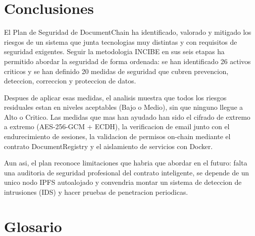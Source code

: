 \documentclass[11pt, a4paper]{article}
\begin{document}
\section{Conclusiones}

El Plan de Seguridad de DocumentChain ha identificado, valorado y mitigado los riesgos de un sistema que junta tecnologias muy distintas y con requisitos de seguridad exigentes. Seguir la metodologia INCIBE en sus seis etapas ha permitido abordar la seguridad de forma ordenada: se han identificado 26 activos criticos y se han definido 20 medidas de seguridad que cubren prevencion, deteccion, correccion y proteccion de datos.

Despues de aplicar esas medidas, el analisis muestra que todos los riesgos residuales estan en niveles aceptables (Bajo o Medio), sin que ninguno llegue a Alto o Critico. Las medidas que mas han ayudado han sido el cifrado de extremo a extremo (AES-256-GCM + ECDH), la verificacion de email junto con el endurecimiento de sesiones, la validacion de permisos on-chain mediante el contrato DocumentRegistry y el aislamiento de servicios con Docker.

Aun asi, el plan reconoce limitaciones que habria que abordar en el futuro: falta una auditoria de seguridad profesional del contrato inteligente, se depende de un unico nodo IPFS autoalojado y convendria montar un sistema de deteccion de intrusiones (IDS) y hacer pruebas de penetracion periodicas.

\section*{Glosario}
\end{document}
